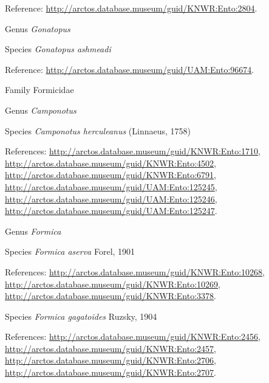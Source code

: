 \documentclass[9pt, article]{memoir}
\begin{document}
\begin{multicols}{2}
Reference: 
\url{http://arctos.database.museum/guid/KNWR:Ento:2804}.

\vspace{6pt}\noindent\hspace{30pt}Genus \textit{Gonatopus}


\vspace{6pt}\noindent\hspace{36pt}Species \textit{Gonatopus ashmeadi}


Reference: 
\url{http://arctos.database.museum/guid/UAM:Ento:96674}.

\vspace{6pt}\noindent\hspace{24pt}Family Formicidae


\vspace{6pt}\noindent\hspace{30pt}Genus \textit{Camponotus}


\vspace{6pt}\noindent\hspace{36pt}Species \textit{Camponotus herculeanus} (Linnaeus, 1758)


References: 
\url{http://arctos.database.museum/guid/KNWR:Ento:1710}, 
\url{http://arctos.database.museum/guid/KNWR:Ento:4502}, 
\url{http://arctos.database.museum/guid/KNWR:Ento:6791}, 
\url{http://arctos.database.museum/guid/UAM:Ento:125245}, 
\url{http://arctos.database.museum/guid/UAM:Ento:125246}, 
\url{http://arctos.database.museum/guid/UAM:Ento:125247}.

\vspace{6pt}\noindent\hspace{30pt}Genus \textit{Formica}


\vspace{6pt}\noindent\hspace{36pt}Species \textit{Formica aserva} Forel, 1901


References: 
\url{http://arctos.database.museum/guid/KNWR:Ento:10268}, 
\url{http://arctos.database.museum/guid/KNWR:Ento:10269}, 
\url{http://arctos.database.museum/guid/KNWR:Ento:3378}.

\vspace{6pt}\noindent\hspace{36pt}Species \textit{Formica gagatoides} Ruzsky, 1904


References: 
\url{http://arctos.database.museum/guid/KNWR:Ento:2456}, 
\url{http://arctos.database.museum/guid/KNWR:Ento:2457}, 
\url{http://arctos.database.museum/guid/KNWR:Ento:2706}, 
\url{http://arctos.database.museum/guid/KNWR:Ento:2707}.


\end{multicols}
\end{document}
